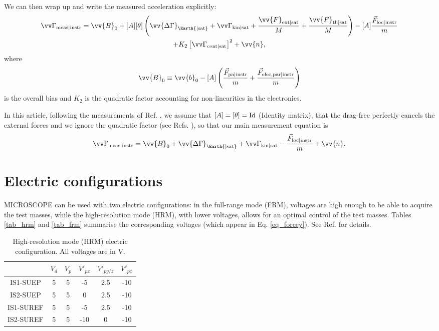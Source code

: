 \documentclass[12pt]{iopart}
\begin{document}
We can then wrap up and write the measured acceleration explicitly:
\begin{multline} \label{eq_kth_measacc}
\vv\Gamma_{\rm meas | instr} = \vv{B}_0 + [A] [\theta]\left( \vv{\Delta\Gamma}_{\Earth {\rm | sat}} + \vv\Gamma_{\rm kin | sat} + \frac{\vv{F}_{\rm ext | sat}}{M}+ \frac{\vv{F}_{\rm th | sat}}{M} \right) - [A] \frac{\vec{F}_{\rm loc | instr}}{m} \\
+ K_2 \left[\vv\Gamma_{\rm cont | sat} \right]^2 + \vv{n},
\end{multline}
where
\begin{equation}
\vv{B}_0 \equiv \vv{b}_0 - [A] \left(\frac{\vec{F}_{\rm pa | instr}}{m} + \frac{\vec{F}_{\rm elec,par | instr}}{m}\right)
\end{equation}
is the overall bias and $K_2$ is the quadratic factor accounting for non-linearities in the electronics. 

In this article, following the measurements of Ref. \cite{touboul19}, we assume that $[A] = [\theta] = {\rm Id}$ (Identity matrix), that the drag-free perfectly cancels the external forces and we ignore the quadratic factor (see Refs. \cite{touboul17, robert20, chhuncqg5}), so that our main measurement equation is
\begin{equation} %
\vv\Gamma_{\rm meas | instr} = \vv{B}_0 + \vv{\Delta\Gamma}_{\Earth {\rm | sat}} + \vv\Gamma_{\rm kin | sat} - \frac{\vec{F}_{\rm loc | instr}}{m} + \vv{n}.
\end{equation}




\section{Electric configurations} \label{app_hrmfrm}

MICROSCOPE can be used with two electric configurations: in the full-range mode (FRM), voltages are high enough to be able to acquire the test masses, while the high-resolution mode (HRM), with lower voltages, allows for an optimal control of the test masses. Tables \ref{tab_hrm} and \ref{tab_frm} summarise the corresponding voltages (which appear in Eq. \ref{eq_forcey}). See Ref. \cite{liorzou20} for details.

\begin{table}%
\caption{High-resolution mode (HRM) electric configuration. All voltages are in V.}
\begin{center}
\begin{tabular}{cccccc}
\hline
& $V_d$ & $V_p$ & $V'_{px}$ & $V'_{py/z}$ & $V'_{p\phi}$ \\
\hline
IS1-SUEP & 5 & 5 & -5 & 2.5 & -10 \\
IS2-SUEP & 5 & 5 & 0 & 2.5 & -10 \\
IS1-SUREF & 5 & 5 & -5 & 2.5 & -10 \\
IS2-SUREF & 5 & 5 & -10 & 0 & -10 \\
\hline
\end{tabular}
\end{center}\label{tab_hrm}
\label{default}
\end{table}%
\end{document}
